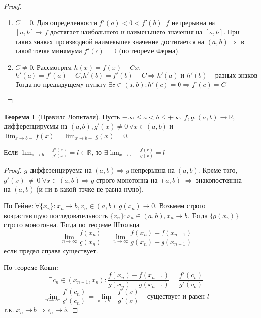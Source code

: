 \documentclass[12pt]{article}
\newenvironment{MyList}[1][4pt]{
  \begin{enumerate}[1.]
  \setlength{\parskip}{0pt}
  \setlength{\itemsep}{#1}
}{       
  \end{enumerate}
}
\def\R{\mathbb{R}}       %
\def\SO{\Rightarrow}     %
\theoremstyle{definition} %
\newtheorem{Thm}{\underline{Теорема}}[subsection] %
\theoremstyle{plain} %
\theoremstyle{remark} %
\begin{document}
\begin{proof}
    \begin{MyList}
        \item $C = 0$. Для определенности $f'(a) < 0 < f'(b)$. $f$ непрерывна на $[a, b] \SO f$ достигает наибольшего и наименьшего значения на $[a, b]$.
        При таких знаках производной наименьшее значение достигается на $(a, b) \SO$ в такой точке минимума $f'(c) = 0$ (по теореме Ферма).

        \item $C \neq 0$. Рассмотрим $h(x) = f(x) - Cx$.
        \[h'(a) = f'(a) - C, h'(b) = f'(b) - C \SO h'(a) \text{ и } h'(b) \text{ -- разных знаков}\]
        Тогда по предыдущему пункту $\exists c \in (a, b) : h'(c) = 0 \SO f'(c) = C$ 
    \end{MyList}
\end{proof}

\begin{Thm}[Правило Лопиталя]
    Пусть $-\infty \leqslant a < b \leqslant +\infty$.
    $f, g : (a, b) \to \R,$ дифференцируемы на $(a, b), g'(x) \neq 0 \ \forall x \in (a, b)$ 
    и $\lim_{x \to b-} f(x) = \lim_{x \to b-} g(x) = 0$.

    Если $\lim_{x \to b-} \frac{f'(x)}{g'(x)} = l \in \overline{\R}$, то $\exists \lim_{x \to b-} \frac{f(x)}{g(x)} = l$
\end{Thm}

\begin{proof}
    $g$ дифференцируема на $(a, b) \SO g$ непрерывна на $(a, b)$. Кроме того, $g'(x)~\neq~0 \ \forall x \in (a, b) \SO g$ строго монотонна на $(a, b)$
    $\SO$ знакопостоянна на $(a, b)$ (и ни в какой точке не равна нулю).

    По Гейне: $\forall \{x_n\} : x_n \to b, x_n \in (a, b) \ g(x_n) \to 0$. 
    Возьмем строго возрастающую последовательность $\{x_n\} : x_n \in (a, b), x_n \to b$. Тогда
    $\{g(x_n)\}$ строго монотонна. Тогда по теореме Штольца 
    \[\lim_{n \to \infty} \frac{f(x_n)}{g(x_n)} = \lim_{n \to \infty} \frac{f(x_n) - f(x_{n - 1})}{g(x_n) - g(x_{n - 1})}\]
    если предел справа существует.

    По теореме Коши:
    \[\exists c_n \in (x_{n - 1}, x_n) : \frac{f(x_n) - f(x_{n - 1})}{g(x_n) - g(x_{n - 1})} = \frac{f'(c_n)}{g'(c_n)}\]
    \[\lim_{n \to \infty} \frac{f'(c_n)}{g'(c_n)} = \lim_{x \to b-} \frac{f'(x)}{g'(x)} \text{ -- существует и равен } l\]
    т.к. $x_n \to b \SO c_n \to b$.
    
\end{proof}
\end{document}
